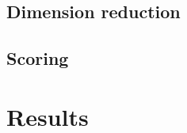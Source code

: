 \documentclass{techrep}
\begin{document}

\subsection{Dimension reduction}
\subsection{Scoring}


\section{Results}
\end{document}
